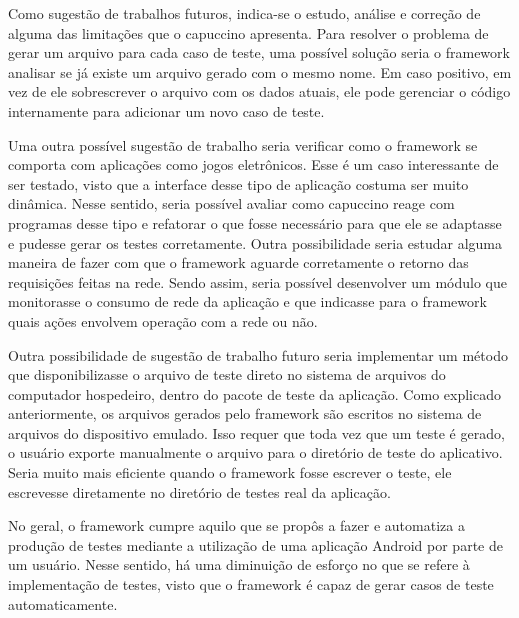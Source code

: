 \documentclass[
    12pt,       %
    openright,      %
    twoside,      %
    a4paper,      %
    english,      %
    french,       %
    spanish,      %
    brazil,       %
    ]{abntex2}
\begin{document}
      Como sugestão de trabalhos futuros, indica-se o estudo, análise e correção de alguma das limitações
      que o capuccino apresenta. Para resolver o problema de gerar um arquivo para cada caso de teste,
      uma possível solução seria o framework analisar se já existe um arquivo gerado com o mesmo nome. Em
      caso positivo, em vez de ele sobrescrever o arquivo com os dados atuais, ele pode gerenciar o código
      internamente para adicionar um novo caso de teste.

      Uma outra possível sugestão de trabalho seria verificar como o framework se comporta com aplicações
      como jogos eletrônicos. Esse é um caso interessante de ser testado, visto que a interface desse
      tipo de aplicação costuma ser muito dinâmica. Nesse sentido, seria possível avaliar como capuccino
      reage com programas desse tipo e refatorar o que fosse necessário para que ele se adaptasse e pudesse
      gerar os testes corretamente. Outra possibilidade seria estudar alguma maneira de fazer com que o
      framework aguarde corretamente o retorno das requisições feitas na rede. Sendo assim, seria possível
      desenvolver um módulo que monitorasse o consumo de rede da aplicação e que indicasse para o framework
      quais ações envolvem operação com a rede ou não.

      Outra possibilidade de sugestão de trabalho futuro seria implementar um método que disponibilizasse o
      arquivo de teste direto no sistema de arquivos do computador hospedeiro, dentro do pacote de teste
      da aplicação. Como explicado anteriormente, os arquivos gerados pelo framework são escritos no sistema
      de arquivos do dispositivo emulado. Isso requer que toda vez que um teste é gerado, o usuário exporte
      manualmente o arquivo para o diretório de teste do aplicativo. Seria muito mais eficiente quando o
      framework fosse escrever o teste, ele escrevesse diretamente no diretório de testes real da aplicação.

      No geral, o framework cumpre aquilo que se propôs a fazer e automatiza a produção de testes
      mediante a utilização de uma aplicação Android por parte de um usuário. Nesse sentido, há uma diminuição
      de esforço no que se refere à implementação de testes, visto que o framework é capaz de gerar casos de teste
      automaticamente.

\end{document}
